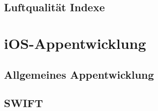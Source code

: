 \subsection{Luftqualität Indexe}\label{subsec:Luftqualität Indexe}

\section{iOS-Appentwicklung}\label{sec:ioS-Appentwicklung}

\subsection{Allgemeines Appentwicklung}\label{subsec:Allgemeines Appentwicklung}

\subsection{SWIFT}\label{subsec:SWIFT}
